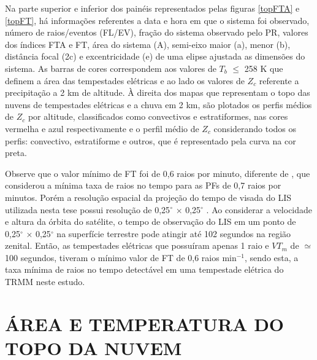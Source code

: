 Na parte superior e inferior dos painéis representados pelas figuras \ref{topFTA} e \ref{topFT}, há informações referentes a data e hora em que o sistema foi observado, número de raios/eventos (FL/EV), fração do sistema observado pelo PR, valores dos índices FTA e FT, área do sistema (A), semi-eixo maior (a), menor (b), distância focal (2c) e excentricidade (e) de uma elipse ajustada as dimensões do sistema. As barras de cores  correspondem aos valores de $T_b$ $\leq$ 258 K que definem a área das tempestades elétricas e ao lado os valores de $Z_c$ referente a precipitação a 2 km de altitude. À direita dos mapas que representam o topo das nuvens de tempestades elétricas e a chuva em 2 km, são plotados os perfis médios de $Z_c$ por altitude, classificados como convectivos e estratiformes, nas cores vermelha e azul respectivamente e o perfil médio de $Z_c$ considerando todos os perfis: convectivo, estratiforme e outros, que é representado pela curva na cor preta.

Observe que o valor mínimo de FT foi de 0,6 raios por minuto, diferente de , que considerou a mínima taxa de raios no tempo para as PFs de 0,7 raios por minutos. Porém a resolução espacial da projeção do tempo de visada do LIS utilizada nesta tese possui resolução de 0,25$^{\circ}$ $\times$ 0,25$^{\circ}$  \cite{albrecht2009tropical,albrecht2011b}. Ao considerar a velocidade e altura da órbita do satélite, o tempo de observação do LIS em um ponto de 0,25$^{\circ}$ $\times$ 0,25$^{\circ}$ na superfície terrestre pode atingir até 102 segundos na região zenital. Então, as tempestades elétricas que possuíram apenas 1 raio e $VT_m$ de $\simeq$100 segundos, tiveram o mínimo valor de FT de 0,6 raios min$^{-1}$, sendo esta, a taxa mínima de raios no tempo detectável em uma tempestade elétrica do TRMM neste estudo.



\section{ÁREA E TEMPERATURA DO TOPO DA NUVEM}


